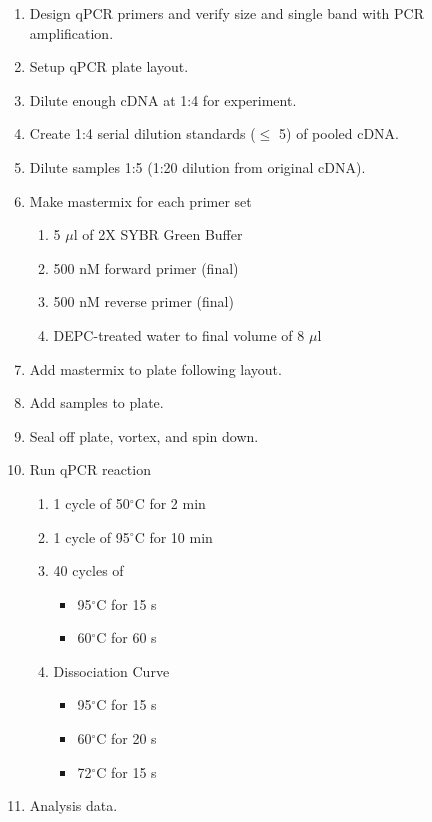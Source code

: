 \begin{enumerate}
\item Design qPCR primers and verify size and single band with PCR amplification.
\item Setup qPCR plate layout.
\item Dilute enough cDNA at 1:4 for experiment.
\item Create 1:4 serial dilution standards ($\le$ 5) of pooled cDNA\footnotemark.
\item Dilute samples 1:5 (1:20 dilution from original cDNA).
\item Make mastermix for each primer set
  \begin{enumerate}
  \item 5 $\mu$l of 2X SYBR Green Buffer
  \item 500 nM forward primer (final)
  \item 500 nM reverse primer (final)
  \item DEPC-treated water to final volume of 8 $\mu$l
  \end{enumerate}
\item Add mastermix to plate following layout.
\item Add samples to plate.
\item Seal off plate, vortex, and spin down.
\item Run qPCR reaction
  \begin{enumerate}
  \item 1 cycle of 50$^{\circ}$C for 2 min
  \item 1 cycle of 95$^{\circ}$C for 10 min
  \item 40 cycles of
    \begin{itemize}
    \item 95$^{\circ}$C for 15 s
    \item 60$^{\circ}$C for 60 s
    \end{itemize}
  \item Dissociation Curve
    \begin{itemize}
    \item 95$^{\circ}$C for 15 s
    \item 60$^{\circ}$C for 20 s
    \item 72$^{\circ}$C for 15 s
    \end{itemize}
  \end{enumerate}
\item Analysis data.
\end{enumerate}

